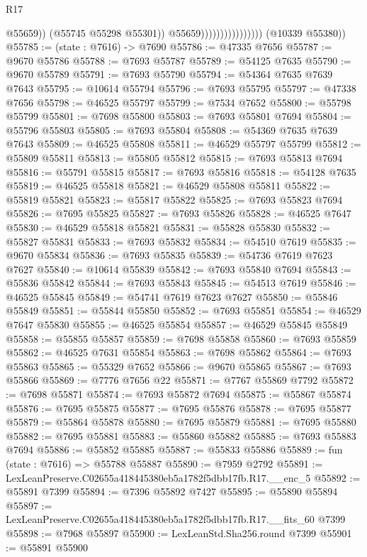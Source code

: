 \begin{lexlean}{R17}
\begin{coremodule}
                                            @55659))
                                        (@55745 @55298 @55301))
                                      @55659))))))))))))))))
      (@10339 @55380))
@55785 := (state : @7616) -> @7690
@55786 := @47335 @7656
@55787 := @9670 @55786
@55788 := @7693 @55787
@55789 := @54125 @7635
@55790 := @9670 @55789
@55791 := @7693 @55790
@55794 := @54364 @7635 @7639 @7643
@55795 := @10614 @55794
@55796 := @7693 @55795
@55797 := @47338 @7656
@55798 := @46525 @55797
@55799 := @7534 @7652
@55800 := @55798 @55799
@55801 := @7698 @55800
@55803 := @7693 @55801 @7694
@55804 := @55796 @55803
@55805 := @7693 @55804
@55808 := @54369 @7635 @7639 @7643
@55809 := @46525 @55808
@55811 := @46529 @55797 @55799
@55812 := @55809 @55811
@55813 := @55805 @55812
@55815 := @7693 @55813 @7694
@55816 := @55791 @55815
@55817 := @7693 @55816
@55818 := @54128 @7635
@55819 := @46525 @55818
@55821 := @46529 @55808 @55811
@55822 := @55819 @55821
@55823 := @55817 @55822
@55825 := @7693 @55823 @7694
@55826 := @7695 @55825
@55827 := @7693 @55826
@55828 := @46525 @7647
@55830 := @46529 @55818 @55821
@55831 := @55828 @55830
@55832 := @55827 @55831
@55833 := @7693 @55832
@55834 := @54510 @7619
@55835 := @9670 @55834
@55836 := @7693 @55835
@55839 := @54736 @7619 @7623 @7627
@55840 := @10614 @55839
@55842 := @7693 @55840 @7694
@55843 := @55836 @55842
@55844 := @7693 @55843
@55845 := @54513 @7619
@55846 := @46525 @55845
@55849 := @54741 @7619 @7623 @7627
@55850 := @55846 @55849
@55851 := @55844 @55850
@55852 := @7693 @55851
@55854 := @46529 @7647 @55830
@55855 := @46525 @55854
@55857 := @46529 @55845 @55849
@55858 := @55855 @55857
@55859 := @7698 @55858
@55860 := @7693 @55859
@55862 := @46525 @7631 @55854
@55863 := @7698 @55862
@55864 := @7693 @55863
@55865 := @55329 @7652
@55866 := @9670 @55865
@55867 := @7693 @55866
@55869 := @7776 @7656 @22
@55871 := @7767 @55869 @7792
@55872 := @7698 @55871
@55874 := @7693 @55872 @7694
@55875 := @55867 @55874
@55876 := @7695 @55875
@55877 := @7695 @55876
@55878 := @7695 @55877
@55879 := @55864 @55878
@55880 := @7695 @55879
@55881 := @7695 @55880
@55882 := @7695 @55881
@55883 := @55860 @55882
@55885 := @7693 @55883 @7694
@55886 := @55852 @55885
@55887 := @55833 @55886
@55889 := fun (state : @7616) => @55788 @55887
@55890 := @7959 @2792
@55891 := LexLeanPreserve.C02655a418445380eb5a1782f5dbb17fb.R17.__enc_5
@55892 := @55891 @7399
@55894 := @7396 @55892 @7427
@55895 := @55890 @55894
@55897 := LexLeanPreserve.C02655a418445380eb5a1782f5dbb17fb.R17.__fits_60 @7399
@55898 := @7968 @55897
@55900 := LexLeanStd.Sha256.round @7399
@55901 := @55891 @55900

\end{coremodule}
\end{lexlean}
